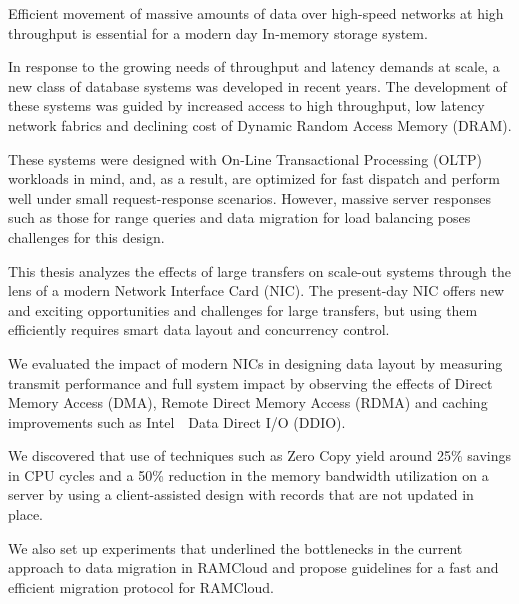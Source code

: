 


Efficient movement of massive amounts of data over high-speed networks at high 
throughput is essential for a modern day In-memory storage system.

In response to the growing needs of throughput and latency demands at scale, a new class of database systems was developed in recent years.
The development of these \linebreak systems was guided by increased access to high throughput, low latency network fabrics and declining cost of Dynamic Random Access Memory (DRAM).

These systems were designed with On-Line Transactional Processing (OLTP) \linebreak workloads in mind, and, as a result, are optimized for fast dispatch and perform well under small
request-response scenarios. However, massive server responses such as those for range queries and data migration for load balancing poses challenges for this design.  

This thesis analyzes the effects of large transfers on scale-out systems through the lens of a modern Network Interface Card (NIC).
The present-day NIC offers new and exciting opportunities and challenges for large transfers, but using them efficiently
 requires smart data layout and concurrency control.

We evaluated the impact of modern NICs in designing data layout by measuring \linebreak transmit 
performance and full system impact by observing the effects of Direct Memory Access (DMA), 
Remote Direct Memory Access (RDMA) and caching improvements such as Intel\textregistered~~Data Direct I/O (DDIO). 

We discovered that use of techniques such as Zero Copy yield around 25\% savings in CPU cycles and a 50\% reduction in the memory bandwidth utilization on a server
by using a client-assisted design with records that are not updated in place. 

We also set up experiments that underlined the bottlenecks in the current approach to data migration in RAMCloud and propose guidelines for a fast and efficient migration protocol for RAMCloud.
